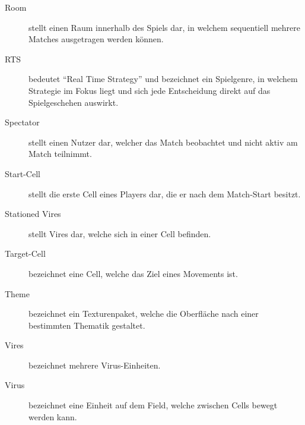 \begin{description}
	\item[Room] stellt einen Raum innerhalb des Spiels dar, in welchem sequentiell mehrere Matches ausgetragen werden können.
	\item[RTS] bedeutet ``Real Time Strategy'' und bezeichnet ein Spielgenre, in welchem Strategie im Fokus liegt und sich jede Entscheidung direkt auf das Spielgeschehen auswirkt.
	\item[Spectator] stellt einen Nutzer dar, welcher das Match beobachtet und nicht aktiv am Match teilnimmt.
	\item[Start-Cell] stellt die erste Cell eines Players dar, die er nach dem Match-Start besitzt.
	\item[Stationed Vires] stellt Vires dar, welche sich in einer Cell befinden.
	\item[Target-Cell] bezeichnet eine Cell, welche das Ziel eines Movements ist.
	\item[Theme] bezeichnet ein Texturenpaket, welche die Oberfläche nach einer bestimmten Thematik gestaltet.
	\item[Vires] bezeichnet mehrere Virus-Einheiten.
	\item[Virus] bezeichnet eine Einheit auf dem Field, welche zwischen Cells bewegt werden kann.
\end{description}